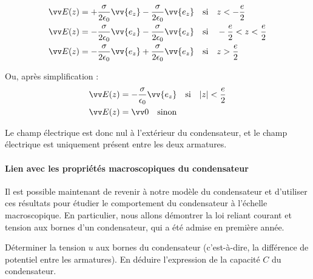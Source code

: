 \documentclass[11pt,fleqn]{book} %
\newcommand{\dd}{\mathrm{d}}
\begin{document}
\begin{align}
    \vv E(z) &= +\frac{\sigma}{2 \epsilon_0} \vv{e_z} -\frac{\sigma}{2 \epsilon_0} \vv{e_z} \quad \mathrm{si} \quad z<-\frac{e}{2}\\
    \vv E(z) &= -\frac{\sigma}{2 \epsilon_0} \vv{e_z} -\frac{\sigma}{2 \epsilon_0} \vv{e_z} \quad \mathrm{si} \quad -\frac{e}{2}<z<\frac{e}{2}\\
    \vv E(z) &= -\frac{\sigma}{2 \epsilon_0} \vv{e_z} +\frac{\sigma}{2 \epsilon_0} \vv{e_z} \quad \mathrm{si} \quad z>\frac{e}{2}\\
\end{align}

Ou, après simplification :
\begin{align}
    \vv E(z) &= -\frac{\sigma}{\epsilon_0} \vv{e_z} \quad \mathrm{si} \quad |z|<\frac{e}{2}\\
    \vv E(z) &= \vv 0 \quad \mathrm{sinon}
\end{align}

Le champ électrique est donc nul à l'extérieur du condensateur, et le champ électrique est uniquement présent entre les deux armatures.

\paragraph{Lien avec les propriétés macroscopiques du condensateur}

Il est possible maintenant de revenir à notre modèle du condensateur et d'utiliser ces résultats pour étudier le comportement du condensateur à l'échelle macroscopique. En particulier, nous allons démontrer la loi reliant courant et tension aux bornes d'un condensateur, qui a été admise en première année.

\begin{capex}
Déterminer la tension $u$ aux bornes du condensateur (c'est-à-dire, la différence de potentiel entre les armatures). En déduire l'expression de la capacité $C$ du condensateur.
\end{capex} 

%
%
\end{document}
